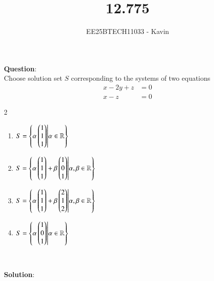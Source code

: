 \documentclass[journal]{IEEEtran}
\begin{document}

\vspace{3cm}

\title{12.775}
\author{EE25BTECH11033 - Kavin}
{\let\newpage\relax\maketitle}

\renewcommand{\thefigure}{\theenumi}
\renewcommand{\thetable}{\theenumi}
\setlength{\intextsep}{10pt} %
\textbf{Question}:\\
Choose solution set $S$ corresponding to the systems of two equations
    \begin{align*}
    x - 2y + z &= 0 \\
    x - z &= 0
    \end{align*}
    \begin{multicols}{2}
    \begin{enumerate}
        \item $S = \left\{ \alpha \begin{pmatrix} 1 \\ 1 \\ 1 \end{pmatrix} \middle| \alpha \in \mathbb{R} \right\}$
        \item $S = \left\{ \alpha \begin{pmatrix} 1 \\ 1 \\ 1 \end{pmatrix} + \beta \begin{pmatrix} 1 \\ 0 \\ 1 \end{pmatrix} \middle| \alpha, \beta \in \mathbb{R} \right\}$
        \item $S = \left\{ \alpha \begin{pmatrix} 1 \\ 1 \\ 1 \end{pmatrix} + \beta \begin{pmatrix} 2 \\ 1 \\ 2 \end{pmatrix} \middle| \alpha, \beta \in \mathbb{R} \right\}$
        \item $S = \left\{ \alpha \begin{pmatrix} 1 \\ 0 \\ 1 \end{pmatrix} \middle| \alpha \in \mathbb{R} \right\}$
    \end{enumerate}
\end{multicols}\\    
\bigskip

\textbf{Solution}:\\
\end{document}

